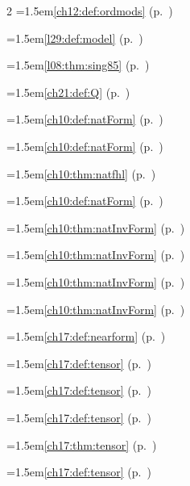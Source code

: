 \begin{multicols}{2}
\hangindent=1.5em\quad \ref{ch12:def:ordmods} (p.~\pageref{ch12:def:ordmods})\par
\hangindent=1.5em\quad \ref{l29:def:model} (p.~\pageref{l29:def:model})\par
\par{}\par\nopagebreak\smallskip
\hangindent=1.5em\quad \ref{l08:thm:sing85} (p.~\pageref{l08:thm:sing85})\par
\hangindent=1.5em\quad \ref{ch21:def:Q} (p.~\pageref{ch21:def:Q})\par
\hangindent=1.5em\quad \ref{ch10:def:natForm} (p.~\pageref{ch10:def:natForm})\par
\hangindent=1.5em\quad \ref{ch10:def:natForm} (p.~\pageref{ch10:def:natForm})\par
\hangindent=1.5em\quad \ref{ch10:thm:natfhl} (p.~\pageref{ch10:thm:natfhl})\par
\hangindent=1.5em\quad \ref{ch10:def:natForm} (p.~\pageref{ch10:def:natForm})\par
\hangindent=1.5em\quad \ref{ch10:thm:natInvForm} (p.~\pageref{ch10:thm:natInvForm})\par
\hangindent=1.5em\quad \ref{ch10:thm:natInvForm} (p.~\pageref{ch10:thm:natInvForm})\par
\hangindent=1.5em\quad \ref{ch10:thm:natInvForm} (p.~\pageref{ch10:thm:natInvForm})\par
\hangindent=1.5em\quad \ref{ch10:thm:natInvForm} (p.~\pageref{ch10:thm:natInvForm})\par
\hangindent=1.5em\quad \ref{ch17:def:nearform} (p.~\pageref{ch17:def:nearform})\par
\hangindent=1.5em\quad \ref{ch17:def:tensor} (p.~\pageref{ch17:def:tensor})\par
\hangindent=1.5em\quad \ref{ch17:def:tensor} (p.~\pageref{ch17:def:tensor})\par
\hangindent=1.5em\quad \ref{ch17:def:tensor} (p.~\pageref{ch17:def:tensor})\par
\hangindent=1.5em\quad \ref{ch17:thm:tensor} (p.~\pageref{ch17:thm:tensor})\par
\hangindent=1.5em\quad \ref{ch17:def:tensor} (p.~\pageref{ch17:def:tensor})\par

\end{multicols}
